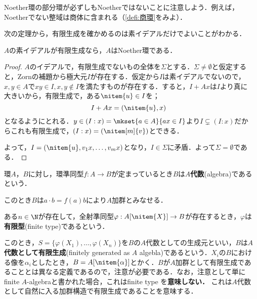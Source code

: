 Noether環の部分環が必ずしもNoetherではないことに注意しよう．例えば，Noetherでない整域は商体に含まれる（\ref{defi:商環}をみよ）．

次の定理から，有限生成を確かめるのは素イデアルだけでよいことがわかる．
\begin{thm}[I.S.Cohen]
	$A$の素イデアルが有限生成なら，$A$はNoether環である．
\end{thm}
\begin{proof}
	$A$のイデアルで，有限生成でないもの全体を$\Sigma$とする．$\Sigma\neq\emptyset$と仮定すると，Zornの補題から極大元$I$が存在する．仮定から$I$は素イデアルでないので，$x,y\in A$で$xy\in I,x,y\not\in I$を満たすものが存在する．すると，$I+Ax$は$I$より真に大きいから，有限生成で，ある$\nitem{u}\in I$を；
	\[I+Ax=(\nitem{u},x)\]
	となるようにとれる．$y\in (I:x)=\mkset{a\in A}{ax\in I}$より$I\subsetneq(I:x)$だからこれも有限生成で，$(I:x)=(\nitem[m]{v})$とできる．
	
	よって，$I=(\nitem{u},v_1x,\dots,v_mx)$となり，$I\in\Sigma$に矛盾．よって$\Sigma=\emptyset$である．
\end{proof}

\begin{defi}[$A$代数]
	環$A，B$に対し，環準同型$f:A\to B$が定まっているとき$B$は$A$\textbf{代数}(algebra)であるという．
\end{defi}

このとき$B$は$a\cdot b=f(a)b$により$A$加群とみなせる．

\begin{defi}[有限型]
	ある$n\in\N$が存在して，全射準同型$\varphi:A[\nitem{X}]\to B$が存在するとき，$\varphi$は\textbf{有限型}(finite type)であるという．
\end{defi}

このとき，$S=\{\varphi(X_1),\dots,\varphi(X_n)\}$を$B$の$A$代数としての生成元といい，$B$は$A$\textbf{代数として有限生成}(finitely generated as $A$ algebla)であるという．$X_i$の$B$における像を$\alpha_i$としたとき，$B=A[\nitem{\alpha}]$とかく．$B$が$A$加群として有限生成であることとは異なる定義であるので，注意が必要である．なお，注意として単にfinite $A$-algebraと書かれた場合，これはfinite type を\textbf{意味しない．} これは$A$代数として自然に入る加群構造で有限生成であることを意味する．

